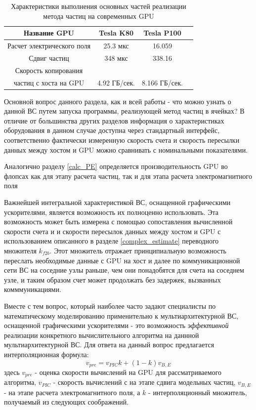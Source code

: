 \begin{table}[ht]
	\begin{center}
		\caption{Характеристики выполнения основных частей реализации метода частиц на современных GPU}
		\begin{tabular}{|c|c|c|c|}
			\hline
			Название GPU                &  Tesla K80   & Tesla P100 \\ \hline
			Расчет электрического поля  &  25.3 мкс    &  16.059    \\ \hline
			Сдвиг частиц                &  348 мкс     &  338.16    \\ \hline
			Скорость копирования        &              &            \\
			частиц с хоста на GPU       & 4.92 ГБ/сек. &8.166 ГБ/сек.  \\ \hline
		\end{tabular}
		\label{PerfGPU}
	\end{center}
\end{table}

Основной вопрос данного раздела, как и всей работы - что можно узнать о данной ВС путем запуска программы, реализующей метод частиц в ячейках? В отличие от 	большинства других разделов информация о характеристиках оборудования в данном случае доступна через стандартный интерфейс, соответственно фактически измеренную скорость счета и скорость пересылки данных между хостом и GPU можно сравнивать с номинальными показателями.

Аналогично разделу \ref{calc_PE} определяется производительность GPU во флопсах как для этапу расчета частиц, так и для этапа расчета электромагнитного поля

Важнейшей интегральной характеристикой ВС, оснащенной графическими ускорителями, является возможность их полноценно использовать. Эта возможность
может быть измерена с помощью сопоставления вычисленной скорости счета и и скорости пересылок данных между хостом и GPU с использованием описанного 
в разделе \ref{complex_estimate} переводного множителя $k_{f2b}$. Этот множитель отражает принципиальную возможность переслать необходимые данные с GPU на хост и далее по коммуникационной сети ВС на соседние узлы раньше, чем они понадобятся для счета на соседнем узле, и таким образом счет может продолжать без задержек, вызванных комммуникациями.

Вместе с тем вопрос, который наиболее часто задают специалисты по математическому моделированию применительно к мультиархитектурной ВС, оснащенной графическими ускорителями - это возможность \textit{эффективной} реализации конкретного вычислительного алгоритма на даннной мультиархитектурной ВС.
Для ответа на данный вопрос предлагается интерполяционная формула:
\begin{equation}
v_{pre} = v_{PIC} k + (1-k) v_{B,E}
\end{equation} 
здесь $ v_{pre}$ - оценка скорости вычислений на GPU для рассматриваемого алгоритма, $v_{PIC}$ - скорость вычислений с на этапе сдвига модельных частиц, $v_{B,E}$ - на этапе расчета электромагнитного поля, а $k$ - интерполяционный множитель, получаемый из следующих соображений.


